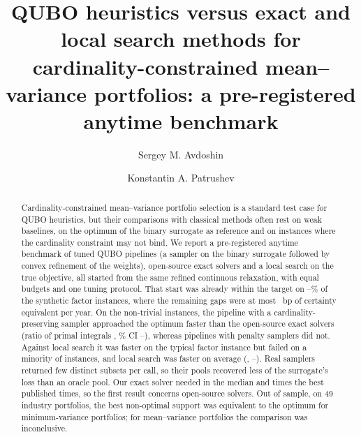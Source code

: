 \documentclass[preprint,12pt]{elsarticle}
\begin{document}
\begin{frontmatter}

\title{QUBO heuristics versus exact and local search methods for cardinality-constrained mean--variance portfolios:
a pre-registered anytime benchmark}

\author[hse]{Sergey M. Avdoshin}
\author[hse]{Konstantin A. Patrushev}

\begin{abstract}
Cardinality-constrained mean--variance portfolio selection is a standard test case for QUBO heuristics, but their
comparisons with classical methods often rest on weak baselines, on the optimum of the binary surrogate as reference
and on instances where the cardinality constraint may not bind. We report a
pre-registered anytime benchmark of tuned QUBO pipelines (a sampler on the binary surrogate followed by convex
refinement of the weights), open-source exact solvers and a local search on the true objective, all started from the
same refined continuous relaxation, with equal budgets and one tuning protocol. That start was already
within the target on --\% of the synthetic factor instances, where
the remaining gaps were at most ~bp of certainty equivalent per year. On the non-trivial
instances, the pipeline with a cardinality-preserving sampler approached the optimum faster than the open-source exact
solvers (ratio of primal integrals , \% CI --),
whereas pipelines with penalty samplers did not. Against local search it was faster on the typical factor instance but
failed on a minority of instances, and local search was faster on average (,
--). Real samplers returned few distinct subsets per call, so their pools
recovered less of the surrogate's loss than an oracle pool. Our
exact solver needed in the median  and  times the best published
times, so the first result concerns open-source solvers. Out of sample, on 49 industry portfolios, the best non-optimal
support was equivalent to the optimum for minimum-variance portfolios; for mean--variance portfolios the comparison was
inconclusive.
\end{abstract}


\end{frontmatter}
\end{document}
